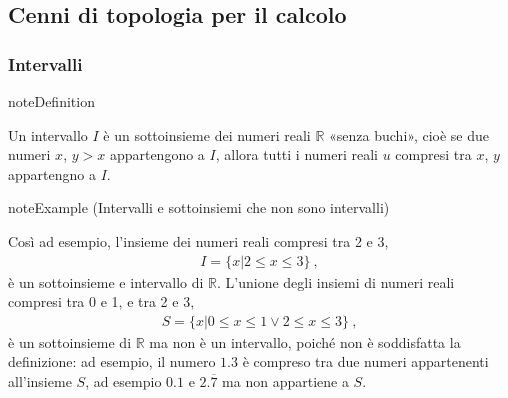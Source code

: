 \documentclass[letterpaper,10pt,italian]{jupyterBook}
\begin{document}
\subsection{Cenni di topologia per il calcolo}
\label{\detokenize{ch/infinitesimal_calculus/analysis:cenni-di-topologia-per-il-calcolo}}
\sphinxAtStartPar
{} 


\subsubsection{Intervalli}
\label{\detokenize{ch/infinitesimal_calculus/analysis:intervalli}}\label{None:interval-def}
\begin{sphinxadmonition}{note}{Definition }



\sphinxAtStartPar
Un intervallo \(I\) è un sottoinsieme dei numeri reali \(\mathbb{R}\) «senza buchi», cioè se due numeri \(x\), \(y > x\) appartengono a \(I\), allora tutti i numeri reali \(u\) compresi tra \(x\), \(y\) appartengno a \(I\).
\end{sphinxadmonition}
\label{None:interval-example}
\begin{sphinxadmonition}{note}{Example  (Intervalli e sottoinsiemi che non sono intervalli)}



\sphinxAtStartPar
Così ad esempio, l’insieme dei numeri reali compresi tra 2 e 3,
\begin{equation*}
\begin{split}I = \{ x | 2 \le x \le 3 \} \ ,\end{split}
\end{equation*}
\sphinxAtStartPar
è un sottoinsieme e intervallo di \(\mathbb{R}\). L’unione degli insiemi di numeri reali compresi tra 0 e 1, e tra 2 e 3,
\begin{equation*}
\begin{split}S = \{ x | 0 \le x \le 1 \lor 2 \le x \le 3 \} \ ,\end{split}
\end{equation*}
\sphinxAtStartPar
è un sottoinsieme di \(\mathbb{R}\) ma non è un intervallo, poiché non è soddisfatta la definizione: ad esempio, il numero \(1.3\) è compreso tra due numeri appartenenti all’insieme \(S\), ad esempio \(0.1\) e \(2.\overline{7}\) ma non appartiene a \(S\).
\end{sphinxadmonition}
\end{document}
